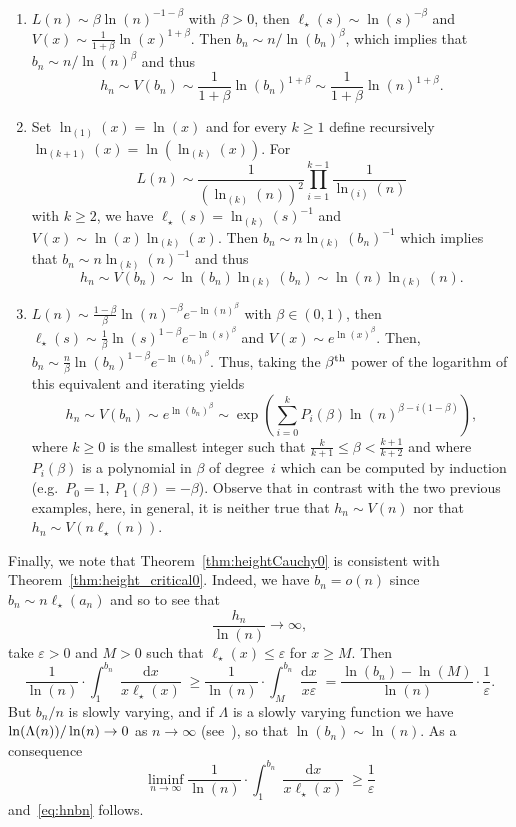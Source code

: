 \documentclass[10pt]{amsart}
\theoremstyle{definition}\newtheorem{defi}[theo]{Definition}\newtheorem{rema}[theo]{Remark}\newtheorem{exam}[theo]{Example}\newtheorem{exem}[theo]{Example}\newtheorem{nota}[theo]{Notation}
\DeclareMathOperator{\dxseq}{d\mathit{x}}
\begin{document}
\begin{enumerate}
\item $L(n) \sim \beta \ln(n)^{-1-\beta} $ with $\beta>0$, then $\ell_{\star}(s) \sim \ln(s)^{-\beta}$ and $V(x) \sim \frac{1}{1+\beta} \ln(x)^{1+\beta}$. Then $ b_{n} \sim n/\ln(b_{n})^{\beta}$, which implies that $ b_{n} \sim n/\ln(n)^{\beta}$ and thus
\[
h_{n}  \sim  V(b_{n})  \sim  \frac{1}{1+\beta} \ln(b_{n})^{1+\beta}  \sim \frac{1}{1+\beta} \ln(n)^{1+\beta}.
\]

\item Set $\ln_{(1)}(x)=\ln(x)$ and for every $k \geq 1$ define recursively $\ln_{(k+1)} (x) = \ln(\ln_{(k)}(x))$. For
\[
L(n)  \sim  \frac{1}{(\ln_{(k)}(n))^{2}} \prod_{i=1}^{k-1} \frac{1}{\ln_{(i)}(n) }
\]
with $k \geq 2$, we have $\ell_{\star}(s)=\ln_{(k)}(s)^{-1}$ and $V(x) \sim \ln(x) \ln_{(k)}(x)$. Then $ b_{n} \sim n \ln_{(k)}(b_{n})^{-1}$ which implies that $ b_{n} \sim n \ln_{(k)}(n)^{-1}$ and thus
\[
h_{n}  \sim  V(b_{n})  \sim  \ln(b_{n}) \ln_{(k)}(b_{n})  \sim  \ln(n) \ln_{(k)}(n).
\]
\item $L(n) \sim \frac{1-\beta}{\beta} \ln(n)^{-\beta} e^{-\ln(n)^{\beta}} $ with $\beta \in (0,1)$, then $\ell_{\star}(s) \sim \frac{1}{\beta} \ln(s)^{1-\beta} e^{-\ln(s)^{\beta}} $ and $V(x) \sim e^{\ln(x)^{\beta}}$. Then, $ b_{n} \sim \frac{n}{\beta} \ln(b_{n})^{1-\beta} e^{-\ln(b_{n})^{\beta}} $. Thus, taking the $\beta^{\text{\normalfont th}}$ power of the logarithm of this equivalent and iterating yields
\[
h_{n}  \sim  V(b_{n})  \sim  e^{\ln(b_{n})^{\beta}}  \sim  \exp \left(\sum_{i=0}^{k} P_{i}(\beta) \ln(n)^{\beta-i(1-\beta)} \right),
\]
where $k \geq 0$ is the smallest integer such that $ \frac{k}{k+1} \leq \beta < \frac{k+1}{k+2}$ and where $P_{i}(\beta)$ is a polynomial in $\beta$ of degree~$i$ which can be computed by induction (e.g.~$P_{0}=1$, $P_{1}(\beta)=-\beta$). Observe that in contrast with the two previous examples, here, in general, it is neither true that $h_{n} \sim V(n)$ nor that $h_{n} \sim V(n \ell_{\star}(n))$.
\end{enumerate}

Finally, we note that Theorem~\ref{thm:heightCauchy0} is consistent with Theorem~\ref{thm:height_critical0}. Indeed, we have $b_{n}=o(n)$ since $ b_{n} \sim n \ell_{\star}(a_{n})$ and so to see that
\begin{equation}\label{eq:hnbn}
\frac{h_{n}}{\ln(n)} \longrightarrow \infty,
\end{equation}
take $\varepsilon>0$ and $M>0$ such that $\ell_{\star}(x) \leq \varepsilon$ for $x \geq M$. Then
\[
\frac{1}{\ln(n)} \cdot \int_{1}^{ b_{n} } \frac{ \dxseq}{x \ell_{\star}(x)} \geq \frac{1}{\ln(n)} \cdot \int_{M}^{ b_{n} } \frac{\dxseq}{x \varepsilon} = \frac{\ln(b_{n})-\ln(M)}{\ln(n)} \cdot \frac{1}{\varepsilon}.
\]
But $ b_{n} /n$ is slowly varying, and if $\Lambda$ is a slowly varying function we have $\ln(\Lambda(n))/\linebreak\ln(n) \rightarrow 0$ as $n \rightarrow \infty$ (see~\cite[Proposition~1.3.6(i)]{BGT89}), so that $\ln(b_{n}) \sim \ln(n)$. As a consequence
\[
\liminf_{n \rightarrow \infty} \frac{1}{\ln(n)} \cdot \int_{1}^{ b_{n} } \frac{\dxseq}{x \ell_{\star}(x)} \geq \frac{1}{\varepsilon}
\]
and~\eqref{eq:hnbn} follows.
\end{document}
